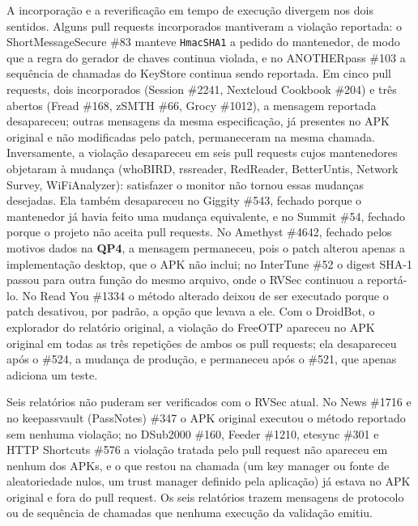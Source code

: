 \documentclass[conference]{IEEEtran}
\newcommand{\researchq}[1]{\textbf{QP#1}}
\begin{document}
A incorporação e a reverificação em tempo de execução divergem nos dois sentidos. Alguns pull requests
incorporados mantiveram a violação reportada: o ShortMessageSecure \#83 manteve \texttt{HmacSHA1} a pedido do mantenedor, de modo que
a regra do gerador de chaves continua violada, e no ANOTHERpass \#103 a sequência de chamadas
do KeyStore continua sendo reportada. Em cinco pull requests, dois incorporados (Session \#2241,
Nextcloud Cookbook \#204) e três abertos (Fread \#168, zSMTH \#66, Grocy
\#1012), a mensagem reportada desapareceu; outras mensagens da mesma especificação, já presentes no
APK original e não modificadas pelo patch, permaneceram na mesma chamada.
Inversamente, a violação desapareceu em seis pull requests cujos mantenedores
objetaram à mudança (whoBIRD, rssreader, RedReader, BetterUntis, Network
Survey, WiFiAnalyzer): satisfazer o monitor não tornou essas mudanças
desejadas. Ela também desapareceu no Giggity \#543, fechado porque o mantenedor
já havia feito uma mudança equivalente, e no Summit \#54, fechado porque o
projeto não aceita pull requests. No Amethyst \#4642, fechado pelos motivos dados na \researchq{4},
a mensagem permaneceu, pois o patch alterou apenas a implementação desktop,
que o APK não inclui; no InterTune \#52 o digest SHA-1 passou para outra função do
mesmo arquivo, onde o RVSec continuou a reportá-lo. No Read You \#1334 o método
alterado deixou de ser executado porque o patch desativou, por padrão, a opção que
levava a ele.
Com o DroidBot, o explorador do relatório original, a violação do FreeOTP
apareceu no APK original em todas as três repetições de ambos os pull requests;
ela desapareceu após o \#524, a mudança de produção, e permaneceu após o \#521,
que apenas adiciona um teste.

Seis relatórios não puderam ser verificados com o RVSec atual. No News \#1716 e no
keepassvault (PassNotes) \#347 o APK original executou o método reportado sem nenhuma
violação; no DSub2000 \#160, Feeder \#1210, etesync \#301 e HTTP Shortcuts
\#576 a violação tratada pelo pull request não apareceu em nenhum dos APKs, e
o que restou na chamada (um key manager ou fonte de aleatoriedade nulos, um
trust manager definido pela aplicação) já estava no APK original e fora
do pull request. Os seis relatórios trazem mensagens de protocolo ou de sequência de chamadas que
nenhuma execução da validação emitiu.
\end{document}
